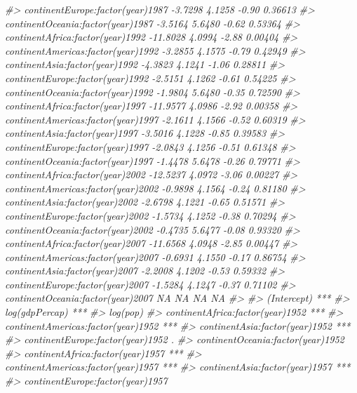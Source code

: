 \documentclass[]{book}
\newenvironment{Shaded}{\begin{snugshade}}{\end{snugshade}}
\newcommand{\CommentTok}[1]{\textcolor[rgb]{0.56,0.35,0.01}{\textit{#1}}}
\begin{document}
\begin{Shaded}
\begin{Highlighting}[]
\CommentTok{#> continentEurope:factor(year)1987    -3.7298     4.1258   -0.90  0.36613}
\CommentTok{#> continentOceania:factor(year)1987   -3.5164     5.6480   -0.62  0.53364}
\CommentTok{#> continentAfrica:factor(year)1992   -11.8028     4.0994   -2.88  0.00404}
\CommentTok{#> continentAmericas:factor(year)1992  -3.2855     4.1575   -0.79  0.42949}
\CommentTok{#> continentAsia:factor(year)1992      -4.3823     4.1241   -1.06  0.28811}
\CommentTok{#> continentEurope:factor(year)1992    -2.5151     4.1262   -0.61  0.54225}
\CommentTok{#> continentOceania:factor(year)1992   -1.9804     5.6480   -0.35  0.72590}
\CommentTok{#> continentAfrica:factor(year)1997   -11.9577     4.0986   -2.92  0.00358}
\CommentTok{#> continentAmericas:factor(year)1997  -2.1611     4.1566   -0.52  0.60319}
\CommentTok{#> continentAsia:factor(year)1997      -3.5016     4.1228   -0.85  0.39583}
\CommentTok{#> continentEurope:factor(year)1997    -2.0843     4.1256   -0.51  0.61348}
\CommentTok{#> continentOceania:factor(year)1997   -1.4478     5.6478   -0.26  0.79771}
\CommentTok{#> continentAfrica:factor(year)2002   -12.5237     4.0972   -3.06  0.00227}
\CommentTok{#> continentAmericas:factor(year)2002  -0.9898     4.1564   -0.24  0.81180}
\CommentTok{#> continentAsia:factor(year)2002      -2.6798     4.1221   -0.65  0.51571}
\CommentTok{#> continentEurope:factor(year)2002    -1.5734     4.1252   -0.38  0.70294}
\CommentTok{#> continentOceania:factor(year)2002   -0.4735     5.6477   -0.08  0.93320}
\CommentTok{#> continentAfrica:factor(year)2007   -11.6568     4.0948   -2.85  0.00447}
\CommentTok{#> continentAmericas:factor(year)2007  -0.6931     4.1550   -0.17  0.86754}
\CommentTok{#> continentAsia:factor(year)2007      -2.2008     4.1202   -0.53  0.59332}
\CommentTok{#> continentEurope:factor(year)2007    -1.5284     4.1247   -0.37  0.71102}
\CommentTok{#> continentOceania:factor(year)2007        NA         NA      NA       NA}
\CommentTok{#>                                       }
\CommentTok{#> (Intercept)                        ***}
\CommentTok{#> log(gdpPercap)                     ***}
\CommentTok{#> log(pop)                              }
\CommentTok{#> continentAfrica:factor(year)1952   ***}
\CommentTok{#> continentAmericas:factor(year)1952 ***}
\CommentTok{#> continentAsia:factor(year)1952     ***}
\CommentTok{#> continentEurope:factor(year)1952   .  }
\CommentTok{#> continentOceania:factor(year)1952     }
\CommentTok{#> continentAfrica:factor(year)1957   ***}
\CommentTok{#> continentAmericas:factor(year)1957 ***}
\CommentTok{#> continentAsia:factor(year)1957     ***}
\CommentTok{#> continentEurope:factor(year)1957      }

\end{Highlighting}
\end{Shaded}
\end{document}
